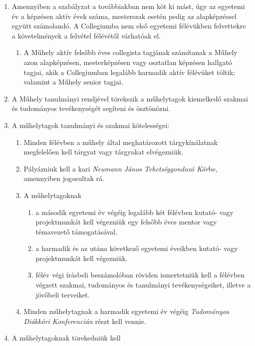 \documentclass{../styles/rulebook}
\begin{document}
\begin{enumerate}
	\item Amennyiben a szabályzat a továbbiakban nem köt ki mást, úgy az egyetemi év a képzésen aktív évek száma, mesterszak esetén pedig az alapképzéssel együtt számolandó. A Collegiumba nem első egyetemi félévükben felvettekre a követelmények a felvétel félévétől várhatóak el.
	      \begin{enumerate}
		      \item A Műhely aktív felsőbb éves collegista tagjának számítanak a Műhely azon alapképzésen, mesterképzésen vagy osztatlan képzésen hallgató tagjai, akik a Collegiumban legalább harmadik aktív félévüket töltik; valamint a Műhely senior tagjai.
	      \end{enumerate}
	\item A Műhely tanulmányi rendjével törekszik a műhelytagok kiemelkedő szakmai és tudományos tevékenységét segíteni és ösztönözni.
	\item A műhelytagok tanulmányi és szakmai kötelességei:
	      \begin{enumerate}
		      \item Minden félévben a műhely által meghatározott tárgykínálatnak megfelelően kell tárgyat vagy tárgyakat elvégezniük.
		      \item Pályázniuk kell a kari \emph{Neumann János Tehetséggondozó Kör}be, amennyiben jogosultak rá.
		      \item A műhelytagoknak
		            \begin{enumerate}
			            \item a második egyetemi év végéig legalább két félévben kutató- vagy projektmunkát kell végezniük egy felsőbb éves mentor vagy témavezető támogatásával.
			            \item a harmadik és az utána következő egyetemi éveikben kutató- vagy projektmunkát kell végezniük.
			            \item félév végi írásbeli beszámolóban röviden ismertetniük kell a félévben végzett szakmai, tudományos és tanulmányi tevékenységeiket, illetve a jövőbeli terveiket.
		            \end{enumerate}
		      \item Minden műhelytagnak a harmadik egyetemi év végéig \emph{Tudományos Diákköri Konferencián} részt kell vennie.
	      \end{enumerate}
	\item A műhelytagoknak törekedniük kell
	      \begin{enumerate}

\end{enumerate}
\end{enumerate}
\end{document}

